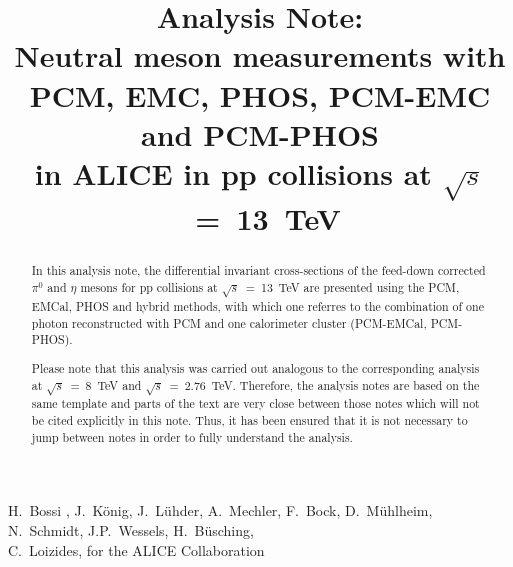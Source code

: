 \documentclass[ALICE]{ALICE_analysis_notes}
\newcommand{\s}{$\sqrt{s}$\xspace}
\newcommand{\sth}{\s~=~13~TeV\xspace}
\newcommand{\sei}{\s~=~8~TeV\xspace}
\newcommand{\stw}{\s~=~2.76~TeV\xspace}
\newcommand{\pp}{pp\xspace}
\newcommand{\PCMEMC}      {\acs{PCM}-\acs{EMCal}}
\newcommand{\PCMPHOS}     {\acs{PCM}-\acs{PHOS}}
\begin{document}
\title{Analysis Note:\\Neutral meson measurements with PCM, EMC, PHOS, PCM-EMC and PCM-PHOS \\
in ALICE in pp collisions at $\sqrt{s}$~=~13~TeV}


\begin{Authlist}
H.~Bossi ,
J.~K\"onig,
J.~L\"uhder,
A.~Mechler,
F.~Bock,
D.~M\"uhlheim,
N.~Schmidt,
J.P.~Wessels,
H.~B\"usching,\\
C.~Loizides,
for the ALICE Collaboration 
\end{Authlist}



%


\vspace{4cm}
\begin{abstract}
In this analysis note, the differential invariant cross-sections of the feed-down corrected $\pi^0$ and $\eta$ mesons for \pp collisions at \sth are presented using the \ac{PCM}, \ac{EMCal}, \ac{PHOS} and hybrid methods, with which one referres to the combination of one photon reconstructed with \ac{PCM} and one calorimeter cluster (\PCMEMC, \PCMPHOS).

Please note that this analysis was carried out analogous to the corresponding analysis at \sei \cite{anaNoteEMC8TeV,anaNotePCMEMC8TeV} and \stw \cite{anaNotePCMEMC2760GeV,anaNoteEMC2760GeV}. Therefore, the analysis notes are based on the same template and parts of the text are very close between those notes which will not be cited explicitly in this note. Thus, it has been ensured that it is not necessary to jump between notes in order to fully understand the analysis.
\end{abstract}

\end{document}
